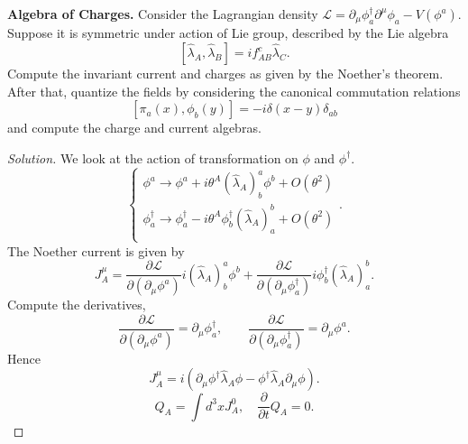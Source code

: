 
\textbf{Algebra of Charges.}
Consider the Lagrangian density $\mathcal{L} = \partial_ \mu \phi_a^\dag \partial^ \mu\phi_a - V(\phi^a)$.
Suppose it is symmetric under action of Lie group, described by the Lie algebra
\[
	\left[ \hat{\lambda} _A, \hat{\lambda} _B \right] = i f_{AB}^c \hat{\lambda} _C
.\] 
Compute the invariant current and charges as given by the Noether's theorem. After that, quantize the fields by considering the canonical commutation relations
\[
	[\pi_a(x), \phi_b(y)] = - i \delta (x - y) \delta_{a b}
\] 
and compute the charge and current algebras.

\begin{proof}[Solution]
	We look at the action of transformation on $\phi$ and $\phi^\dag$.
	\[
		\begin{cases}
			\phi^a \to \phi^a + i \theta^A (\hat{\lambda} _A)^a_b \phi^b + O(\theta^2) \\
			\phi^\dag_a \to \phi^\dag_a - i \theta^A \phi^\dag _b (\hat{\lambda} _A)^b_a + O(\theta^2) \\
		\end{cases}
	.\] 
	The Noether current is given by
	\[
		J_A^\mu = \frac{\partial \mathcal{L}}{\partial (\partial_ \mu \phi^a)} i (\hat{\lambda} _A) ^a_b\phi^b + \frac{\partial \mathcal{L}}{\partial (\partial_ \mu \phi^\dag_a)} i \phi_b^\dag (\hat{\lambda} _A)^b_a
	.\] 
	Compute the derivatives,
	\[
		\frac{\partial \mathcal{L}}{\partial \left( \partial _ \mu \phi^a \right)} = \partial _ \mu \phi^\dag _a,
		\qquad
		\frac{\partial \mathcal{L}}{\partial \left( \partial _ \mu \phi^\dag _a \right) }  = \partial_ \mu \phi^a
	.\] 
	Hence
	\[
		J_A^ \mu=
		i\left( \partial _ \mu \phi^\dag \hat{\lambda} _A \phi - \phi^\dag \hat{\lambda} _A \partial _ \mu \phi \right) 
	.\] 
	\[
		Q_A = \int d^3 x J_A^0, \quad \frac{\partial }{\partial t} Q_A = 0
	.\] 


\end{proof}
